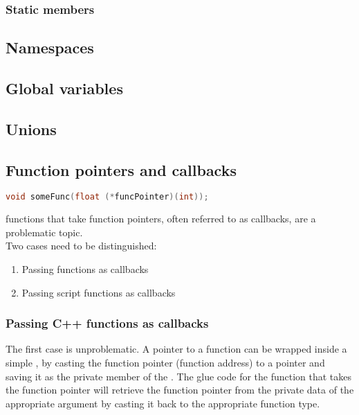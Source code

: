 \subsubsection{Static members}

\subsection{Namespaces}

\subsection{Global variables}

\subsection{Unions}

\subsection{Function pointers and callbacks}

\SingleSpacing
\begin{lstlisting}[language=C++, caption=\myProperName{C++} function that takes a function pointer]
void someFunc(float (*funcPointer)(int));
\end{lstlisting}
\OnehalfSpacing

 functions that take function pointers, often referred to as callbacks, are a problematic topic.\\
Two cases need to be distinguished:
\begin{enumerate}
\item Passing  functions as callbacks
\item Passing script functions as callbacks
\end{enumerate}

\subsubsection{Passing C++ functions as callbacks}

The first case is unproblematic. A pointer to a  function can be wrapped inside a simple , by casting the function pointer (function address) to a  pointer and saving it as the private member of the . The glue code for the function that takes the function pointer will retrieve the function pointer from the private data of the appropriate argument by casting it back to the appropriate function type.


